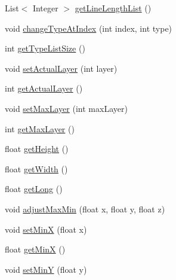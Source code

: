 \begin{DoxyCompactItemize}
\item 
List$<$ Integer $>$ \hyperlink{classandroid_1_1app_1_1printerapp_1_1viewer_1_1_data_storage_a4ff4990698dc688ad40337b599d6f4c7}{get\+Line\+Length\+List} ()
\item 
void \hyperlink{classandroid_1_1app_1_1printerapp_1_1viewer_1_1_data_storage_a2ca2c4a24cc10aee4f83ee11578aecd9}{change\+Type\+At\+Index} (int index, int type)
\item 
int \hyperlink{classandroid_1_1app_1_1printerapp_1_1viewer_1_1_data_storage_ab12f0475ecc3c892ac82e7f46613c4e6}{get\+Type\+List\+Size} ()
\item 
void \hyperlink{classandroid_1_1app_1_1printerapp_1_1viewer_1_1_data_storage_a4ced093cf7d37f79f1f4881d8a7d7750}{set\+Actual\+Layer} (int layer)
\item 
int \hyperlink{classandroid_1_1app_1_1printerapp_1_1viewer_1_1_data_storage_a35510907f19d2bae2d32d318aa3ce1ce}{get\+Actual\+Layer} ()
\item 
void \hyperlink{classandroid_1_1app_1_1printerapp_1_1viewer_1_1_data_storage_a5aa874452541a71ea1d1f553a19d86f2}{set\+Max\+Layer} (int max\+Layer)
\item 
int \hyperlink{classandroid_1_1app_1_1printerapp_1_1viewer_1_1_data_storage_aa7853006cbf57bccd0cead124711eec4}{get\+Max\+Layer} ()
\item 
float \hyperlink{classandroid_1_1app_1_1printerapp_1_1viewer_1_1_data_storage_a6a421a39442aa620caf2a6c740f017d0}{get\+Height} ()
\item 
float \hyperlink{classandroid_1_1app_1_1printerapp_1_1viewer_1_1_data_storage_a851fe20126b006a4aa25e622362eec80}{get\+Width} ()
\item 
float \hyperlink{classandroid_1_1app_1_1printerapp_1_1viewer_1_1_data_storage_af679e92e40bb1a22e645aa4639174c40}{get\+Long} ()
\item 
void \hyperlink{classandroid_1_1app_1_1printerapp_1_1viewer_1_1_data_storage_ac31d3e4a27bee213925a072ae31815df}{adjust\+Max\+Min} (float x, float y, float z)
\item 
void \hyperlink{classandroid_1_1app_1_1printerapp_1_1viewer_1_1_data_storage_a9f9ef87decb41f6760e2ee658cb2aa3b}{set\+MinX} (float x)
\item 
float \hyperlink{classandroid_1_1app_1_1printerapp_1_1viewer_1_1_data_storage_adc015a47aea13dd65a723265a38bd910}{get\+MinX} ()
\item 
void \hyperlink{classandroid_1_1app_1_1printerapp_1_1viewer_1_1_data_storage_a882603c071760f388cc853f0e6a1ceb8}{set\+MinY} (float y)
\item 

\end{DoxyCompactItemize}
